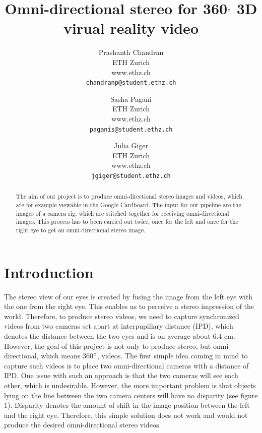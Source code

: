 \documentclass[10pt,twocolumn,letterpaper]{article}
\begin{document}
\title{Omni-directional stereo for 360$\degree$ 3D virual reality video}

\author{Prashanth Chandran\\
ETH Zurich\\
www.ethz.ch\\
{\tt\small chandranp@student.ethz.ch}
\and
Sasha Pagani\\
ETH Zurich\\
www.ethz.ch\\
{\tt\small paganis@student.ethz.ch}
\and
Julia Giger\\
ETH Zurich\\
www.ethz.ch\\
{\tt\small jgiger@student.ethz.ch}
}

\maketitle

\begin{abstract}
   The aim of our project is to produce omni-directional stereo images and videos, which are for example viewable in the Google Cardboard. The input for our pipeline are the images of a camera rig, which are stitched together for receiving omni-directional images. This process has to been carried out twice, once for the left and once for the right eye to get an omni-directional stereo image.
\end{abstract}

\section{Introduction}

The stereo view of our eyes is created by fusing the image from the left eye with the one from the right eye. This enables us to perceive a stereo impression of the world. Therefore, to produce stereo videos, we need to capture synchronized videos from two cameras set apart at interpupillary distance (IPD), which denotes the distance between the two eyes and is on average about 6.4 cm. However, the goal of this project is not only to produce stereo, but omni-directional, which means 360$\degree$, videos. The first simple idea coming in mind to capture such videos is to place two omni-directional cameras with a distance of IPD. One issue with such an approach is that the two cameras will see each other, which is undesirable. However, the more important problem is that objects lying on the line between the two camera centers will have no disparity (see figure 1). Disparity denotes the amount of shift in the image position between the left and the right eye. Therefore, this simple solution does not work and would not produce the desired omni-directional stereo videos.
\end{document}

